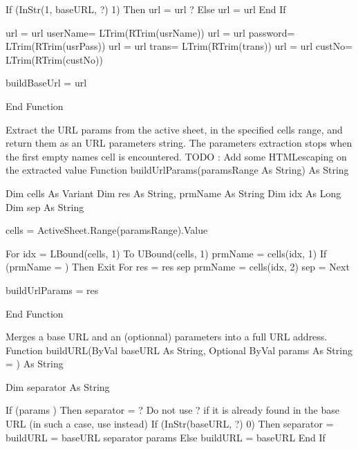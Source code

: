 \documentclass[letterpaper,10pt,english]{sphinxmanual}
\begin{document}
\begin{sphinxVerbatim}[commandchars=\\\{\}]
   If (InStr(1, baseURL, \PYGZdq{}?\PYGZdq{}) \PYGZlt{} 1) Then
      url = url \PYGZam{} \PYGZdq{}?\PYGZdq{}
   Else
      url = url \PYGZam{} \PYGZdq{}\PYGZam{}\PYGZdq{}
   End If

   url = url \PYGZam{} \PYGZdq{}userName=\PYGZdq{} \PYGZam{} LTrim(RTrim(usrName))
   url = url \PYGZam{} \PYGZdq{}\PYGZam{}password=\PYGZdq{} \PYGZam{} LTrim(RTrim(usrPass))
   url = url \PYGZam{} \PYGZdq{}\PYGZam{}trans=\PYGZdq{} \PYGZam{} LTrim(RTrim(trans))
   url = url \PYGZam{} \PYGZdq{}\PYGZam{}custNo=\PYGZdq{} \PYGZam{} LTrim(RTrim(custNo))


   buildBaseUrl = url

End Function


\PYGZsq{} Extract the \PYGZsq{}URL params\PYGZsq{} from the active sheet, in the specified cells range,
\PYGZsq{} and return them as an URL parameters string.
\PYGZsq{} The parameters extraction stops when the first empty name\PYGZsq{}s cell is encountered.
\PYGZsq{}
\PYGZsq{} TODO : Add some HTML\PYGZhy{}escaping on the extracted value
\PYGZsq{}
Function buildUrlParams(paramsRange As String) As String

   Dim cells As Variant
   Dim res As String, prmName As String
   Dim idx As Long
   Dim sep As String

   cells = ActiveSheet.Range(paramsRange).Value

   For idx = LBound(cells, 1) To UBound(cells, 1)
      prmName = cells(idx, 1)
      If (prmName = \PYGZdq{}\PYGZdq{}) Then Exit For
      res = res \PYGZam{} sep \PYGZam{} prmName \PYGZam{} \PYGZdq{}=\PYGZdq{} \PYGZam{} cells(idx, 2)
      sep = \PYGZdq{}\PYGZam{}\PYGZdq{}
   Next

   buildUrlParams = res

End Function


\PYGZsq{} Merges a base URL and an (optionnal) parameters into a full URL address.
\PYGZsq{}
Function buildURL(ByVal baseURL As String, Optional ByVal params As String = \PYGZdq{}\PYGZdq{}) As String

   Dim separator As String

   If (params \PYGZlt{}\PYGZgt{} \PYGZdq{}\PYGZdq{}) Then
      separator = \PYGZdq{}?\PYGZdq{}
      \PYGZsq{} Do not use \PYGZsq{}?\PYGZsq{} if it is already found in the base URL (in such a case, use \PYGZsq{}\PYGZam{}\PYGZsq{} instead)
      If (InStr(baseURL, \PYGZdq{}?\PYGZdq{}) \PYGZgt{} 0) Then separator = \PYGZdq{}\PYGZam{}\PYGZdq{}
      buildURL = baseURL \PYGZam{} separator \PYGZam{} params
   Else
      buildURL = baseURL
   End If


\end{sphinxVerbatim}
\end{document}
